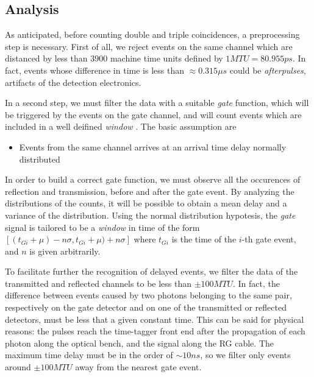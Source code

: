 \documentclass[10pt, final]{article}
\begin{document}
\begin{multicols}{2}
\subsection*{Analysis}
As anticipated, before counting double and triple coincidences, a preprocessing step is necessary. First of all, we reject events on the same channel which are distanced by less than $3900$ machine time units defined by $1 MTU = 80.955 ps$. In fact, events whose difference in time is less than $\approx 0.315 \mu s$ could be \emph{afterpulses}, artifacts of the detection electronics.

In a second step, we must filter the data with a suitable \emph{gate} function, which will be triggered by the events on the gate channel, and will count events which are included in a well deifined \emph{window} . The basic assumption are
\begin{itemize}
    \item Events from the same channel arrives at an arrival time delay normally distributed 
\end{itemize} 

In order to build a correct gate function, we must observe all the occurences of reflection and transmission, before and after the gate event. By analyzing the distributions of the counts, it will be possible to obtain a mean delay and a variance of the distribution. Using the normal distribution hypotesis, the \emph{gate} signal is tailored to be a \emph{window} in time of the form $[(t_{Gi} + \mu) -n\sigma, t_{Gi} + \mu) + n\sigma]$ where $t_{Gi}$ is the time of the $i$-th gate event, and $n$ is given arbitrarily.

To facilitate further the recognition of delayed events, we filter the data of the transmitted and reflected channels to be less than $\pm 100 MTU$.
In fact, the difference between events caused by two photons belonging to the same pair, respectively on the gate detector and on one of the transmitted or reflected detectors, must be less that a given constant time. This can be said for physical reasons: the pulses reach the time-tagger front end after the propagation of each photon along the optical bench, and the signal along the RG cable. The maximum time delay must be in the order of $\sim 10 ns$, so we filter only events around $\pm 100 MTU$ away from the nearest gate event.
\end{multicols}
\end{document}
